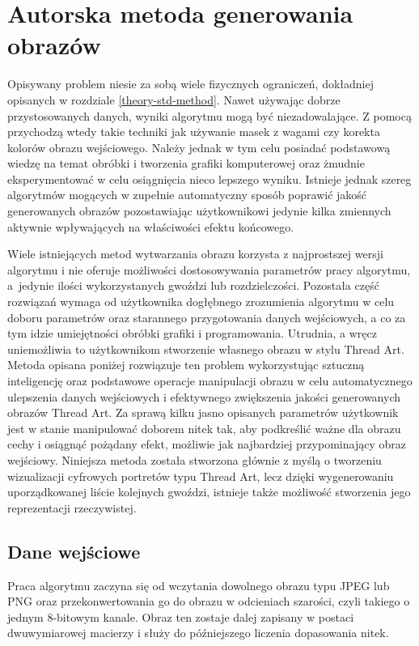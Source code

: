        
\chapter{Autorska metoda generowania obrazów} \label{mine}
Opisywany problem niesie za sobą wiele fizycznych ograniczeń, dokładniej opisanych w rozdziale \ref{theory-std-method}. Nawet używając dobrze przystosowanych danych, wyniki algorytmu mogą być niezadowalające. Z pomocą przychodzą wtedy takie techniki jak używanie masek z wagami czy korekta kolorów obrazu wejściowego. Należy jednak w tym celu posiadać podstawową wiedzę na temat obróbki i tworzenia grafiki komputerowej oraz żmudnie eksperymentować w celu osiągnięcia nieco lepszego wyniku. Istnieje jednak szereg algorytmów mogących w zupełnie automatyczny sposób poprawić jakość generowanych obrazów pozostawiając użytkownikowi jedynie kilka zmiennych aktywnie wpływających na właściwości efektu końcowego. 

Wiele istniejących metod wytwarzania obrazu korzysta z najprostszej wersji algorytmu i nie oferuje możliwości dostosowywania parametrów pracy algorytmu, a~jedynie ilości wykorzystanych gwoździ lub rozdzielczości. Pozostała część rozwiązań wymaga od użytkownika dogłębnego zrozumienia algorytmu w celu doboru parametrów oraz starannego przygotowania danych wejściowych, a co za tym idzie umiejętności obróbki grafiki i programowania. Utrudnia, a wręcz uniemożliwia to użytkownikom stworzenie własnego obrazu w stylu Thread Art. Metoda opisana poniżej rozwiązuje ten problem wykorzystując sztuczną inteligencję oraz podstawowe operacje manipulacji obrazu w celu automatycznego ulepszenia danych wejściowych i efektywnego zwiększenia jakości generowanych obrazów Thread Art. Za sprawą kilku jasno opisanych parametrów użytkownik jest w stanie manipulować doborem nitek tak, aby podkreślić ważne dla obrazu cechy i osiągnąć pożądany efekt, możliwie jak najbardziej przypominający obraz wejściowy. Niniejsza metoda została stworzona głównie z myślą o tworzeniu wizualizacji cyfrowych portretów typu Thread Art, lecz dzięki wygenerowaniu uporządkowanej liście kolejnych gwoździ, istnieje także możliwość stworzenia jego reprezentacji rzeczywistej. 

    \section{Dane wejściowe} \label{mine-input}
    Praca algorytmu zaczyna się od wczytania dowolnego obrazu typu JPEG lub PNG oraz przekonwertowania go do obrazu w odcieniach szarości, czyli takiego o jednym 8-bitowym kanale. Obraz ten zostaje dalej zapisany w postaci dwuwymiarowej macierzy i służy do późniejszego liczenia dopasowania nitek.
    
